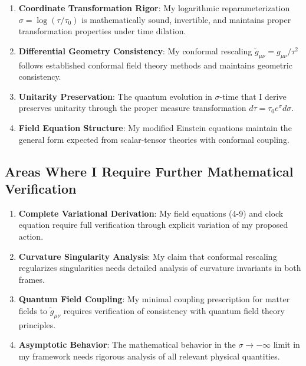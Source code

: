 \documentclass[11pt,a4paper]{article}
\begin{document}
\begin{enumerate}
\item \textbf{Coordinate Transformation Rigor}: My logarithmic reparameterization $\sigma = \log(\tau/\tau_0)$ is mathematically sound, invertible, and maintains proper transformation properties under time dilation.

\item \textbf{Differential Geometry Consistency}: My conformal rescaling $\tilde{g}_{\mu\nu} = g_{\mu\nu}/\tau^2$ follows established conformal field theory methods and maintains geometric consistency.

\item \textbf{Unitarity Preservation}: The quantum evolution in $\sigma$-time that I derive preserves unitarity through the proper measure transformation $d\tau = \tau_0 e^{\sigma} d\sigma$.

\item \textbf{Field Equation Structure}: My modified Einstein equations maintain the general form expected from scalar-tensor theories with conformal coupling.
\end{enumerate}

\subsection{Areas Where I Require Further Mathematical Verification}

\begin{enumerate}
\item \textbf{Complete Variational Derivation}: My field equations (4-9) and clock equation require full verification through explicit variation of my proposed action.

\item \textbf{Curvature Singularity Analysis}: My claim that conformal rescaling regularizes singularities needs detailed analysis of curvature invariants in both frames.

\item \textbf{Quantum Field Coupling}: My minimal coupling prescription for matter fields to $\tilde{g}_{\mu\nu}$ requires verification of consistency with quantum field theory principles.

\item \textbf{Asymptotic Behavior}: The mathematical behavior in the $\sigma \to -\infty$ limit in my framework needs rigorous analysis of all relevant physical quantities.
\end{enumerate}
\end{document}
